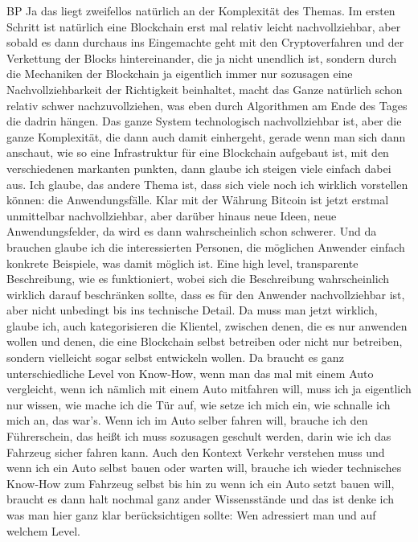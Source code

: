 \begin{xlist}
    \item[BP] Ja das liegt zweifellos natürlich an der Komplexität des Themas. Im ersten Schritt ist natürlich eine Blockchain erst mal relativ leicht nachvollziehbar, aber sobald es dann durchaus ins Eingemachte geht mit den Cryptoverfahren und der Verkettung der Blocks hintereinander, die ja nicht unendlich ist, sondern durch die Mechaniken der Blockchain ja eigentlich immer nur sozusagen eine Nachvollziehbarkeit der Richtigkeit beinhaltet, macht das Ganze natürlich schon relativ schwer nachzuvollziehen, was eben durch Algorithmen am Ende des Tages die dadrin hängen. Das ganze System technologisch nachvollziehbar ist, aber die ganze Komplexität, die dann auch damit einhergeht, gerade wenn man sich dann anschaut, wie so eine Infrastruktur für eine Blockchain aufgebaut ist, mit den verschiedenen markanten punkten, dann glaube ich steigen viele einfach dabei aus. Ich glaube, das andere Thema ist, dass sich viele noch ich wirklich vorstellen können: die Anwendungsfälle. Klar mit der Währung Bitcoin ist jetzt erstmal unmittelbar nachvollziehbar, aber darüber hinaus neue Ideen, neue Anwendungsfelder, da wird es dann wahrscheinlich schon schwerer. Und da brauchen glaube ich die interessierten Personen, die möglichen Anwender einfach konkrete Beispiele, was damit möglich ist. Eine high level, transparente Beschreibung, wie es funktioniert, wobei sich die Beschreibung wahrscheinlich wirklich darauf beschränken sollte, dass es für den Anwender nachvollziehbar ist, aber nicht unbedingt bis ins technische Detail. Da muss man jetzt wirklich, glaube ich, auch kategorisieren die Klientel, zwischen denen, die es nur anwenden wollen und denen, die eine Blockchain selbst betreiben oder nicht nur betreiben, sondern vielleicht sogar selbst entwickeln wollen. Da braucht es ganz unterschiedliche Level von Know-How, wenn man das mal mit einem Auto vergleicht, wenn ich nämlich mit einem Auto mitfahren will, muss ich ja eigentlich nur wissen, wie mache ich die Tür auf, wie setze ich mich ein, wie schnalle ich mich an, das war's. Wenn ich im Auto selber fahren will, brauche ich den Führerschein, das heißt ich muss sozusagen geschult werden, darin wie ich das Fahrzeug sicher fahren kann. Auch den Kontext Verkehr verstehen muss und wenn ich ein Auto selbst bauen oder warten will, brauche ich wieder technisches Know-How zum Fahrzeug selbst bis hin zu wenn ich ein Auto setzt bauen will, braucht es dann halt nochmal ganz ander Wissensstände und das ist denke ich was man hier ganz klar berücksichtigen sollte: Wen adressiert man und auf welchem Level. 

\end{xlist}
